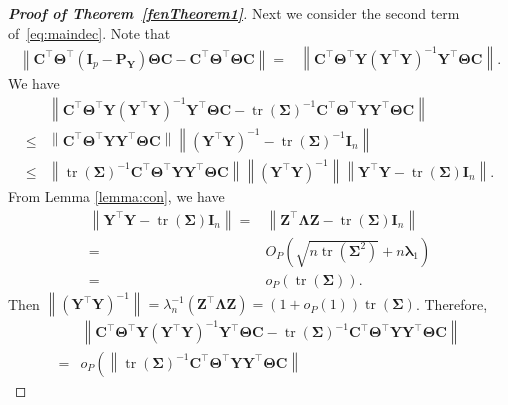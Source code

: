 \documentclass[10pt]{book}
\theoremstyle{definition}
\DeclareMathOperator{\mytr}{tr}
\newcommand{\bZ}{\mathbf{Z}}
\newcommand{\bP}{\mathbf{P}}
\newcommand{\bY}{\mathbf{Y}}
\newcommand{\bC}{\mathbf{C}}
\newcommand{\bI}{\mathbf{I}}
\newcommand{\bfsym}[1]{\ensuremath{\boldsymbol{#1}}}
\def\blambda {\bfsym {\lambda}}
\def\bLambda {\bfsym {\Lambda}}
\def\bSigma {\bfsym {\Sigma}}
\def\bTheta {\bfsym {\Theta}}
\begin{document}
\begin{proof}[\textbf{Proof of Theorem~\ref{fenTheorem1}}]
Next we consider the second term of~\eqref{eq:maindec}.
Note that 
\begin{equation*}
    \begin{split}
    \left\|
    \bC^\top \bTheta^\top (\bI_p-\bP_\bY)\bTheta \bC
    -\bC^\top \bTheta^\top\bTheta \bC
    \right\|
    =&
    \left\|
    \bC^\top \bTheta^\top \bY (\bY^\top \bY)^{-1} \bY^\top \bTheta \bC
    \right\|
    .
    \end{split}
\end{equation*}
We have
\begin{equation*}
    \begin{split}
    &\left\|
    \bC^\top \bTheta^\top \bY (\bY^\top \bY)^{-1} \bY^\top \bTheta \bC
    -{\mytr(\bSigma)}^{-1}
\bC^\top \bTheta^\top
\bY \bY^\top 
    \bTheta \bC
    \right\|
    \\
    \leq&
    \left\|
\bC^\top \bTheta^\top
 \bY \bY^\top 
    \bTheta \bC
    \right\|
    \left\|
   (\bY^\top \bY)^{-1} -{\mytr(\bSigma)}^{-1}\bI_{n}
    \right\|
    \\
    \leq&
    \left\|
{\mytr(\bSigma)}^{-1}
\bC^\top \bTheta^\top
\bY \bY^\top 
    \bTheta \bC
    \right\|
    \left\|
(\bY^\top \bY)^{-1}
    \right\|
    \left\|
   \bY^\top \bY -\mytr(\bSigma)\bI_{n}
   \right\|.
    \end{split}
\end{equation*}
From Lemma \ref{lemma:con}, we have
\begin{equation*}
    \begin{split}
    \left\|
   \bY^\top \bY -\mytr(\bSigma)\bI_{n}
   \right\|
   =&
    \left\|
   \bZ^\top \bLambda \bZ -\mytr(\bSigma)\bI_{n}
   \right\|
   \\
   =&
   O_P(\sqrt{n\mytr(\bSigma^2)}+n\blambda_1)
   \\
   =&o_P(\mytr(\bSigma))
   .
    \end{split}
\end{equation*}
   Then
   $
    \left\|
(\bY^\top \bY)^{-1}
    \right\|
    =\lambda_n^{-1}
    (\bZ^\top \bLambda \bZ)=(1+o_P(1))\mytr(\bSigma)
    $.
    Therefore,
\begin{equation*}
    \begin{split}
    &\left\|
    \bC^\top \bTheta^\top 
    \bY (\bY^\top \bY)^{-1}\bY^\top 
    \bTheta \bC
    -{\mytr(\bSigma)}^{-1}
\bC^\top \bTheta^\top
\bY \bY^\top 
\bTheta \bC
    \right\|
    \\
    =&
    o_P\left(
    \left\|
{\mytr(\bSigma)}^{-1}
\bC^\top \bTheta^\top
 \bY \bY^\top 
 \bTheta \bC
    \right\|

\end{split}
\end{equation*}
\end{proof}
\end{document}
